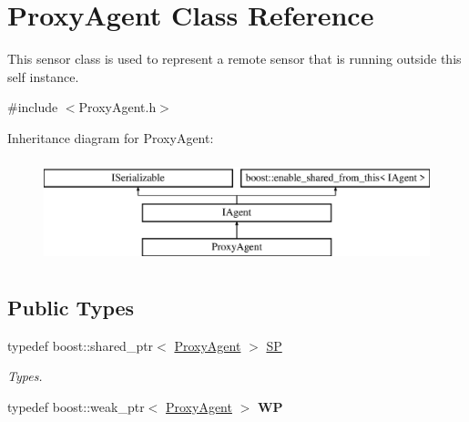 \hypertarget{class_proxy_agent}{}\section{Proxy\+Agent Class Reference}
\label{class_proxy_agent}


This sensor class is used to represent a remote sensor that is running outside this self instance.  




{\ttfamily \#include $<$Proxy\+Agent.\+h$>$}

Inheritance diagram for Proxy\+Agent\+:\begin{figure}[H]
\begin{center}
\leavevmode
\includegraphics[height=3.000000cm]{class_proxy_agent}
\end{center}
\end{figure}
\subsection*{Public Types}
\begin{DoxyCompactItemize}
\item 
\mbox{\label{class_proxy_agent_abc4706bbb488127acadcbb3943f311c7}} 
typedef boost\+::shared\+\_\+ptr$<$ \hyperlink{class_proxy_agent}{Proxy\+Agent} $>$ \hyperlink{class_proxy_agent_abc4706bbb488127acadcbb3943f311c7}{SP}
\begin{DoxyCompactList}\small\item\em Types. \end{DoxyCompactList}\item 
\mbox{\label{class_proxy_agent_ac79c762f3dfbe797e9555b0b8b284d5f}} 
typedef boost\+::weak\+\_\+ptr$<$ \hyperlink{class_proxy_agent}{Proxy\+Agent} $>$ {\bfseries WP}
\end{DoxyCompactItemize}
